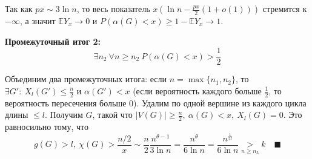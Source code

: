 \par Так как $px \sim 3\ln{n}$, то весь показатель $x(\ln{n}-\frac{px}{2}(1+o(1)))$ стремится к $-\infty$, а значит $\mathbb{E}Y_x \rightarrow 0$ и $P(\alpha(G)<x) \geq 1-\mathbb{E}Y_x \rightarrow 1$.
\par \textbf{Промежуточный итог 2:} $$\exists n_2\: \forall n\geq n_2 \: P(\alpha(G)<x)>\frac{1}{2}$$
\par Объединим два промежуточных итога: если $n=\max \{n_1, n_2 \}$, то $\exists G': \: X_l(G') \leq \frac{n}{2}$ и  $\alpha(G') < x$ (если вероятность каждого больше $\frac{1}{2}$, то вероятность пересечения больше 0). Удалим по одной вершине из каждого цикла длины $\leq l$. Получим $G$, такой что $|V(G)|\geq \frac{n}{2}, \: \alpha(G)<x, \: X_l(G)=0$. Это равносильно тому, что $$g(G)>l, \: \chi(G)>\frac{n/2}{x}\sim \frac{n}{2} \frac{n^{\theta-1}}{3\ln{n}}=\frac{n^\theta}{6\ln{n}}=\frac{n^{\frac{1}{2l}}}{6\ln{n}}\underset{n \geq n_3}{>}k \quad \blacksquare$$